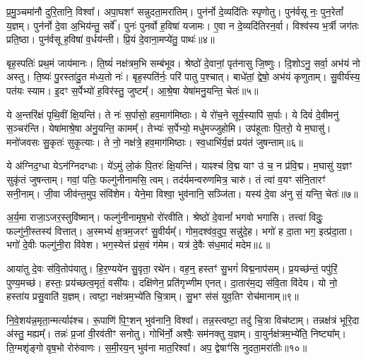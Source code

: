 प्र॒मु॒ञ्चमा॑नौ दुरि॒तानि॒ विश्वा᳚।
अपा॒घशꣳ॑ सन्नुदता॒मरा॑तिम्।
पुन॑र्नो दे॒व्यदि॑तिः स्पृणोतु।
पुन॑र्वसू नः॒ पुन॒रेतां᳚ य॒ज्ञम्।
पुन॑र्नो दे॒वा अ॒भिय॑न्तु॒ सर्वे᳚।
पुनः॑ पुनर्वो ह॒विषा॑ यजामः।
ए॒वा न दे॒व्यदि॑तिरन॒र्वा।
विश्व॑स्य भ॒र्त्री जग॑तः प्रति॒ष्ठा।
पुन॑र्वसू ह॒विषा॑ व॒र्धय॑न्ती।
प्रि॒यं दे॒वाना॒मप्ये॑तु॒ पाथः॑॥४॥\ip

बृह॒स्पतिः॑ प्रथ॒मं जाय॑मानः।
ति॒ष्यं॑ नक्ष॑त्रम॒भि सम्ब॑भूव।
श्रेष्ठो॑ दे॒वानां॒ पृत॑नासु जि॒ष्णुः।
दि॒शोऽनु॒ सर्वा॒ अभ॑यं नो अस्तु।
ति॒ष्यः॑ पु॒रस्ता॑दु॒त म॑ध्य॒तो नः॑।
बृह॒स्पति॑र्नः॒ परि॑ पातु प॒श्चात्।
बाधे॑तां॒ द्वेषो॒ अभ॑यं कृणुताम्।
सु॒वीर्य॑स्य॒ पत॑यः स्याम।
इ॒दꣳ स॒र्पेभ्यो॑ ह॒विर॑स्तु॒ जुष्टम्᳚।
आ॒श्रे॒षा येषा॑मनु॒यन्ति॒ चेतः॑॥५॥\ip

ये अ॒न्तरि॑क्षं पृथि॒वीं क्षि॒यन्ति॑।
ते नः॑ स॒र्पासो॒ हव॒माग॑मिष्ठाः।
ये रो॑च॒ने सूर्य॒स्यापि॑ स॒र्पाः।
ये दिवं॑ दे॒वीमनु॑ स॒ञ्चर॑न्ति।
येषा॑माश्रे॒षा अ॑नु॒यन्ति॒ कामम्᳚।
तेभ्यः॑ स॒र्पेभ्यो॒ मधु॑मज्जुहोमि।
उप॑हूताः पि॒तरो॒ ये म॒घासु॑।
मनो॑जवसः सु॒कृतः॑ सुकृ॒त्याः।
ते नो॒ नक्ष॑त्रे॒ हव॒माग॑मिष्ठाः।
स्व॒धाभि॑र्य॒ज्ञं प्रय॑तं जुषन्ताम्॥६॥\ip

ये अ॑ग्निद॒ग्धा येऽन॑ग्निदग्धाः।
ये॑ऽमुं लो॒कं पि॒तरः॑ क्षि॒यन्ति॑।
याꣴश्च॑ वि॒द्म याꣳ उ॑ च॒ न प्र॑वि॒द्म।
म॒घासु॑ य॒ज्ञꣳ सुकृ॑तं जुषन्ताम्।
गवां॒ पतिः॒ फल्गु॑नीनामसि॒ त्वम्।
तद॑र्यमन्वरुणमित्र॒ चारु॑।
तं त्वा॑ व॒यꣳ स॑नि॒तारꣳ॑ सनी॒नाम्।
जी॒वा जीव॑न्त॒मुप॒ संवि॑शेम।
येने॒मा विश्वा॒ भुव॑नानि॒ सञ्जि॑ता।
यस्य॑ दे॒वा अ॑नु सं॒ यन्ति॒ चेतः॑॥७॥\ip

अ॒र्य॒मा राजा॒\-ऽजर॒स्तुवि॑ष्मान्।
फल्गु॑नीनामृष॒भो रो॑रवीति।
श्रेष्ठो॑ दे॒वानां᳚ भगवो भगासि।
तत्त्वा॑ विदुः॒ फल्गु॑नी॒स्तस्य॑ वित्तात्।
अ॒स्मभ्यं॑ क्ष॒त्रम॒जरꣳ॑ सु॒वीर्यम्᳚।
गोम॒दश्व॑व॒दुप॒ सन्नु॑\-दे॒ह।
भगो॑ ह दा॒ता भग॒ इत्प्र॑दा॒ता।
भगो॑ दे॒वीः फल्गु॑नी॒रा वि॑वेश।
भग॒स्येत्तं प्र॑स॒वं ग॑मेम।
यत्र॑ दे॒वैः स॑ध॒मादं॑ मदेम॥८॥\ip

आया॑तु दे॒वः स॑वि॒तोप॑यातु।
हि॒र॒ण्यये॑न सु॒वृता॒ रथे॑न।
वह॒न्॒ हस्तꣳ॑ सु॒भगं॑ विद्म॒नाप॑सम्।
प्र॒यच्छ॑न्तं॒ पपु॑रिं॒ पुण्य॒मच्छ॑।
हस्तः॒ प्रय॑च्छत्व॒मृतं॒ वसी॑यः।
दक्षि॑णेन॒ प्रति॑\-गृभ्णीम एनत्।
दा॒तार॑म॒द्य स॑वि॒ता वि॑देय।
यो नो॒ हस्ता॑य प्रसु॒वाति॑ य॒ज्ञम्।
त्वष्टा॒ नक्ष॑त्रम॒भ्ये॑ति चि॒त्राम्।
सु॒भꣳ स॑सं युव॒तिꣳ रोच॑मानाम्॥९॥\ip

नि॒वे॒शय॑न्न॒\-मृता॒न्मर्त्याꣴ॑श्च।
रू॒पाणि॑ पि॒ꣳ॒शन् भुव॑नानि॒ विश्वा᳚।
तन्न॒स्त्वष्टा॒ तदु॑ चि॒त्रा विच॑ष्टाम्।
तन्नक्ष॑त्रं भूरि॒दा अ॑स्तु॒ मह्यम्᳚।
तन्नः॑ प्र॒जां वी॒रव॑तीꣳ सनोतु।
गोभि॑र्नो॒ अश्वैः॒ सम॑नक्तु य॒ज्ञम्।
वा॒युर्नक्ष॑त्रम॒भ्ये॑ति॒ निष्ट्या᳚म्।
ति॒ग्मशृ॑ङ्गो वृष॒भो रोरु॑वाणः।
स॒मी॒रय॒न् भुव॑ना मात॒रिश्वा᳚।
अप॒ द्वेषाꣳ॑सि नुदता॒मरा॑तीः॥१०॥\ip

